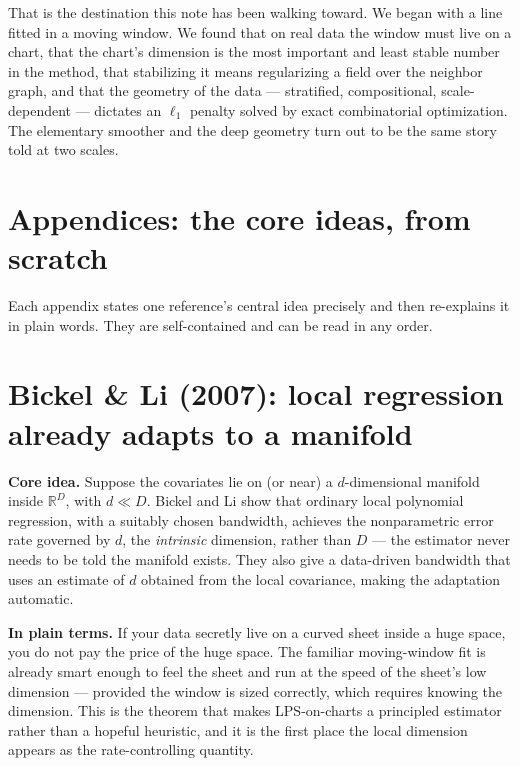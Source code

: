 \documentclass[11pt]{article}
\theoremstyle{definition}
\theoremstyle{remark}
\newcommand{\R}{\mathbb{R}}
\begin{document}
That is the destination this note has been walking toward. We began with a line
fitted in a moving window. We found that on real data the window must live on a
chart, that the chart's dimension is the most important and least stable number in
the method, that stabilizing it means regularizing a field over the neighbor graph,
and that the geometry of the data --- stratified, compositional, scale-dependent ---
dictates an $\ell_1$ penalty solved by exact combinatorial optimization. The
elementary smoother and the deep geometry turn out to be the same story told at two
scales.

\appendix
\renewcommand{\thefigure}{\Alph{section}.\arabic{figure}}
\section*{\centering Appendices: the core ideas, from scratch}
\medskip
\noindent Each appendix states one reference's central idea precisely and then
re-explains it in plain words. They are self-contained and can be read in any
order.

\section{Bickel \& Li (2007): local regression already adapts to a manifold}
\label{app:bickelli}
\textbf{Core idea.} Suppose the covariates lie on (or near) a $d$-dimensional
manifold inside $\R^D$, with $d \ll D$. Bickel and Li show that ordinary local
polynomial regression, with a suitably chosen bandwidth, achieves the nonparametric
error rate governed by $d$, the \emph{intrinsic} dimension, rather than $D$ --- the
estimator never needs to be told the manifold exists. They also give a
data-driven bandwidth that uses an estimate of $d$ obtained from the local
covariance, making the adaptation automatic.

\textbf{In plain terms.} If your data secretly live on a curved sheet inside a
huge space, you do not pay the price of the huge space. The familiar moving-window
fit is already smart enough to feel the sheet and run at the speed of the sheet's
low dimension --- provided the window is sized correctly, which requires knowing
the dimension. This is the theorem that makes LPS-on-charts a principled estimator
rather than a hopeful heuristic, and it is the first place the local dimension
appears as the rate-controlling quantity.
\end{document}
